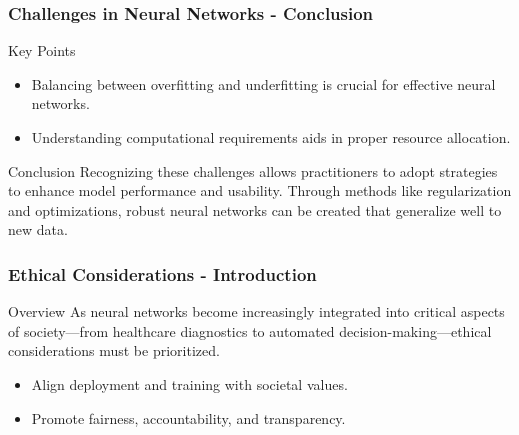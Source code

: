 \documentclass[aspectratio=169]{beamer}
\begin{document}
\begin{frame}[fragile]
  \frametitle{Challenges in Neural Networks - Conclusion}

  \begin{block}{Key Points}
    \begin{itemize}
      \item Balancing between overfitting and underfitting is crucial for effective neural networks.
      \item Understanding computational requirements aids in proper resource allocation.
    \end{itemize}
  \end{block}

  \begin{block}{Conclusion}
    Recognizing these challenges allows practitioners to adopt strategies to enhance model performance and usability. 
    Through methods like regularization and optimizations, robust neural networks can be created that generalize well to new data.
  \end{block}
\end{frame}

\begin{frame}[fragile]
    \frametitle{Ethical Considerations - Introduction}
    \begin{block}{Overview}
        As neural networks become increasingly integrated into critical aspects of society—from healthcare diagnostics to automated decision-making—ethical considerations must be prioritized. 
    \end{block}
    \begin{itemize}
        \item Align deployment and training with societal values.
        \item Promote fairness, accountability, and transparency.
    \end{itemize}
\end{frame}
\end{document}
